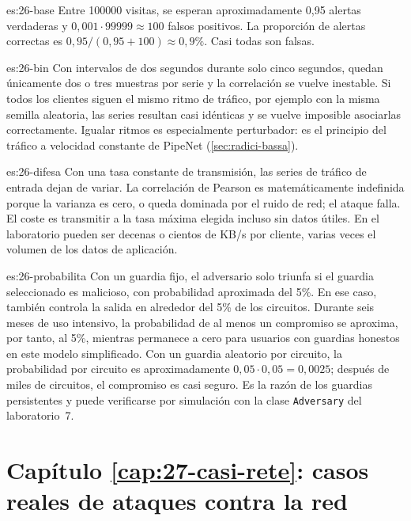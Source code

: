 \begin{soluzione}{es:26-base}
Entre \num{100000} visitas, se esperan aproximadamente 0,95 alertas verdaderas y $0{,}001\cdot99999\approx100$ falsos positivos. La proporción de alertas correctas es $0{,}95/(0{,}95+100)\approx0{,}9\%$. Casi todas son falsas.
\end{soluzione}

\begin{soluzione}{es:26-bin}
Con intervalos de dos segundos durante solo cinco segundos, quedan únicamente dos o tres muestras por serie y la correlación se vuelve inestable. Si todos los clientes siguen el mismo ritmo de tráfico, por ejemplo con la misma semilla aleatoria, las series resultan casi idénticas y se vuelve imposible asociarlas correctamente. Igualar ritmos es especialmente perturbador: es el principio del tráfico a velocidad constante de PipeNet (\cref{sec:radici-bassa}).
\end{soluzione}

\begin{soluzione}{es:26-difesa}
Con una tasa constante de transmisión, las series de tráfico de entrada dejan de variar. La correlación de Pearson es matemáticamente indefinida porque la varianza es cero, o queda dominada por el ruido de red; el ataque falla. El coste es transmitir a la tasa máxima elegida incluso sin datos útiles. En el laboratorio pueden ser decenas o cientos de KB/s por cliente, varias veces el volumen de los datos de aplicación.
\end{soluzione}

\begin{soluzione}{es:26-probabilita}
Con un guardia fijo, el adversario solo triunfa si el guardia seleccionado es malicioso, con probabilidad aproximada del 5\%. En ese caso, también controla la salida en alrededor del 5\% de los circuitos. Durante seis meses de uso intensivo, la probabilidad de al menos un compromiso se aproxima, por tanto, al 5\%, mientras permanece a cero para usuarios con guardias honestos en este modelo simplificado. Con un guardia aleatorio por circuito, la probabilidad por circuito es aproximadamente $0{,}05\cdot0{,}05=0{,}0025$; después de miles de circuitos, el compromiso es casi seguro. Es la razón de los guardias persistentes y puede verificarse por simulación con la clase \texttt{Adversary} del laboratorio~7.
\end{soluzione}

\section*{Capítulo \ref{cap:27-casi-rete}: casos reales de ataques contra la red}

